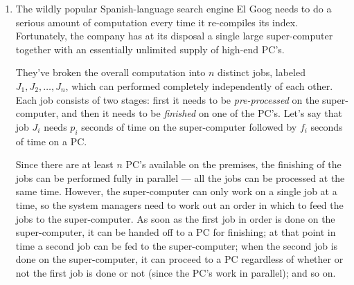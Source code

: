 \documentclass[12pt]{article}
\begin{document}
\begin{enumerate}



\item 

The wildly popular Spanish-language search engine El Goog needs to do
a serious amount of computation every time it re-compiles its index.
Fortunately, the company has at its disposal a single large
super-computer together with an essentially unlimited supply
of high-end PC's.

They've broken the overall computation into $n$
distinct jobs, labeled $J_1, J_2, \ldots, J_n$,
which can performed completely independently of each other.
Each job consists of two stages:
first it needs to be {\em pre-processed} on the super-computer,
and then it needs to be {\em finished} on one of the PC's.
Let's say that job $J_i$ needs $p_i$ seconds of
time on the super-computer followed by $f_i$ seconds of time on a PC.

Since there are at least $n$ PC's available on the premises,
the finishing of the jobs can be performed fully in parallel ---
all the jobs can be processed at the same time.
However, the super-computer can only work on a single
job at a time, so the system managers need to work out
an order in which to feed the jobs to the super-computer.
As soon as the first job in order is done on the super-computer,
it can be handed off to a PC for finishing;
at that point in time a second job can be fed to the super-computer;
when the second job is done on the super-computer,
it can proceed to a PC regardless
of whether or not the first job is done or not
(since the PC's work in parallel);
and so on.


\end{enumerate}
\end{document}
